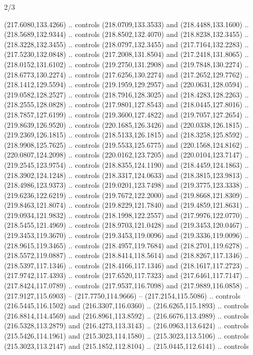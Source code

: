 \begin{flagdescription}{2/3}
\begin{scope}[xshift=0.5\flaglength,yshift=0.5\flagwidth,scale=\flagwidth/180]
\begin{scope}[y=0.8pt, x=0.8pt, yscale=-1,shift={(-168.75,-108.75)}]
  (217.6080,133.4266) .. controls (218.0709,133.3533) and (218.4488,133.1600) ..
  (218.5689,132.9344) .. controls (218.8502,132.4070) and (218.8238,132.3455) ..
  (218.3228,132.3455) .. controls (218.0797,132.3455) and (217.7164,132.2283) ..
  (217.5230,132.0848) .. controls (217.2008,131.8504) and (217.2418,131.8065) ..
  (218.0152,131.6102) .. controls (219.2750,131.2908) and (219.7848,130.2274) ..
  (218.6773,130.2274) .. controls (217.6256,130.2274) and (217.2652,129.7762) ..
  (218.1412,129.5594) .. controls (219.1959,129.2957) and (220.0631,128.0594) ..
  (219.0582,128.2527) .. controls (218.7916,128.3025) and (218.4283,128.2263) ..
  (218.2555,128.0828) .. controls (217.9801,127.8543) and (218.0445,127.8016) ..
  (218.7857,127.6199) .. controls (219.3600,127.4822) and (219.7057,127.2654) ..
  (219.8639,126.9520) .. controls (220.1685,126.3426) and (220.0338,126.1815) ..
  (219.2369,126.1815) .. controls (218.5133,126.1815) and (218.3258,125.8592) ..
  (218.9908,125.7625) .. controls (219.5533,125.6775) and (220.1568,124.8162) ..
  (220.0807,124.2098) .. controls (220.0162,123.7205) and (220.0104,123.7147) ..
  (219.2545,123.9754) .. controls (218.8355,124.1190) and (218.4459,124.1863) ..
  (218.3902,124.1248) .. controls (218.3317,124.0633) and (218.3815,123.9813) ..
  (218.4986,123.9373) .. controls (219.0201,123.7498) and (219.3775,123.3338) ..
  (219.6236,122.6219) .. controls (219.7672,122.2000) and (219.8668,121.8309) ..
  (219.8463,121.8074) .. controls (219.8229,121.7840) and (219.4859,121.8631) ..
  (219.0934,121.9832) .. controls (218.1998,122.2557) and (217.9976,122.0770) ..
  (218.5455,121.4969) .. controls (218.9703,121.0428) and (219.3453,120.0467) ..
  (219.3453,119.3670) .. controls (219.3453,119.0096) and (219.3336,119.0096) ..
  (218.9615,119.3465) .. controls (218.4957,119.7684) and (218.2701,119.6278) ..
  (218.5572,119.0887) .. controls (218.8414,118.5614) and (218.8267,117.1346) ..
  (218.5397,117.1346) .. controls (218.4166,117.1346) and (218.1617,117.2723) ..
  (217.9742,117.4393) .. controls (217.6520,117.7323) and (217.6461,117.7147) ..
  (217.8424,117.0789) .. controls (217.9537,116.7098) and (217.9889,116.0858) ..
  (217.9127,115.6903) -- (217.7750,114.9666) -- (217.2154,115.5086) .. controls
  (216.5445,116.1502) and (216.3307,116.0360) .. (216.6265,115.1893) .. controls
  (216.8814,114.4569) and (216.8961,113.8592) .. (216.6676,113.4989) .. controls
  (216.5328,113.2879) and (216.4273,113.3143) .. (216.0963,113.6424) .. controls
  (215.5426,114.1961) and (215.3023,114.1580) .. (215.3023,113.5106) .. controls
  (215.3023,113.2147) and (215.1852,112.8104) .. (215.0445,112.6141) .. controls

\end{scope}
\end{scope}
\end{flagdescription}
